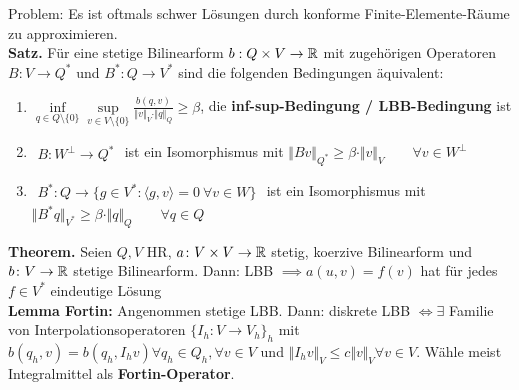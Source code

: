 \documentclass[12pt]{scrartcl}
\begin{document}
	Problem: Es ist oftmals schwer Lösungen durch konforme Finite-Elemente-Räume zu approximieren.\\
	\textbf{Satz.} Für eine stetige Bilinearform $b:Q\times V\to\mathbb{R}$ mit zugehörigen Operatoren
	$B\colon V\to Q^\ast$ und $B^\ast\colon Q\to V^\ast$ sind die folgenden Bedingungen äquivalent:
	\begin{enumerate}[label=(\roman*)]
		\item $\inf\limits_{q\in Q\setminus\lbrace0\rbrace}\sup\limits_{v\in V\setminus\lbrace0\rbrace}\frac{b(q,v)}{\Vert v\Vert_V\cdot\Vert q\Vert_Q}\geq\beta$, die \textbf{inf-sup-Bedingung / LBB-Bedingung} ist 
		\item $\begin{aligned}
			B\colon W^\perp\to Q^\ast
		\end{aligned}$ ist ein Isomorphismus mit $\Vert B v\Vert_{Q^\ast}\geq\beta\cdot\Vert v\Vert_V\qquad\forall v\in W^\perp$
		\item $\begin{aligned}
			B^\ast\colon Q\to\big\lbrace g\in V^\ast:\langle g,v\rangle=0~\forall v\in W\big\rbrace
		\end{aligned}$ ist ein Isomorphismus mit $\big\Vert B^\ast q\big\Vert_{V^\ast}\geq\beta\cdot\Vert q\Vert_Q\qquad\forall q\in Q$
	\end{enumerate}
	\textbf{Theorem.} Seien $Q,V$ HR, $a\colon V\times V\to\mathbb{R}$ stetig, koerzive Bilinearform und $b\colon V\to\mathbb{R}$ stetige Bilinearform. Dann: LBB $\implies a(u,v)=f(v)$ hat für jedes $f\in V^\ast$ eindeutige Lösung\\
	\textbf{Lemma Fortin:} Angenommen stetige LBB. Dann: diskrete LBB $\Leftrightarrow\exists$ Familie von Interpolationsoperatoren $\lbrace I_h:V\to V_h\rbrace_h$ mit $b(q_h,v)=b(q_h,I_h v)\forall q_h\in Q_h,\forall v\in V$ und $\Vert I_h v\Vert_V\leq c\Vert v\Vert_V\forall v\in V$. Wähle meist Integralmittel als \textbf{Fortin-Operator}.
	
\end{document}
